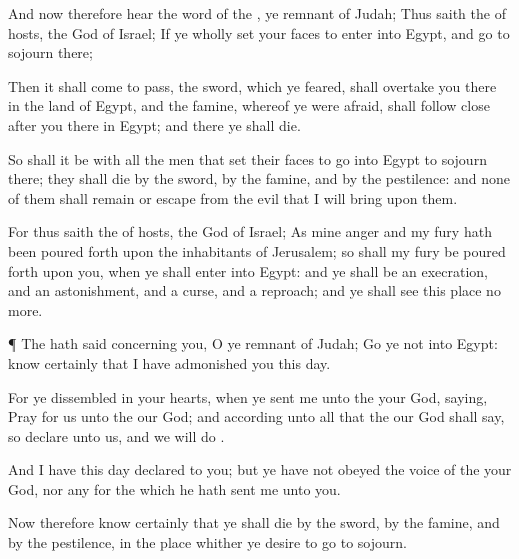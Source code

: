{And now therefore
hear the
word of the
{}, ye
remnant of
Judah; Thus
saith the
{} of
hosts, the
God of
Israel; If ye
wholly
set your
faces to
enter into
Egypt, and
go to
sojourn there;

Then it shall come to pass,
{} the
sword, which ye
feared, shall
overtake you there in the
land of
Egypt, and the
famine, whereof ye were
afraid, shall follow
close
after you there in
Egypt; and there ye shall
die.

So shall it be with all the
men that
set their
faces to
go into
Egypt to
sojourn there; they shall
die by the
sword, by the
famine, and by the
pestilence: and none of them shall
remain or
escape
from the
evil that I will
bring upon them.

For thus
saith the
{} of
hosts, the
God of
Israel; As mine
anger and my
fury hath been poured
forth upon the
inhabitants of
Jerusalem; so shall my
fury be poured
forth upon you, when ye shall
enter into
Egypt: and ye shall be an
execration, and an
astonishment, and a
curse, and a
reproach; and ye shall
see this
place no more.


\par }{\PP {}¶ The
{} hath
said concerning you, O ye
remnant of
Judah;
Go ye not into
Egypt:
know
certainly that I have
admonished you this
day.

For ye
dissembled in your
hearts, when ye
sent me unto the
{} your
God,
saying,
Pray for us unto the
{} our
God; and according unto all that the
{} our
God shall
say, so
declare unto us, and we will
do
{}.

And
{} I have this
day
declared
{} to you; but ye have not
obeyed the
voice of the
{} your
God, nor any
{} for the which he hath
sent me unto you.

Now therefore
know
certainly that ye shall
die by the
sword, by the
famine, and by the
pestilence, in the
place whither ye
desire to
go
{} to
sojourn.




\par }
